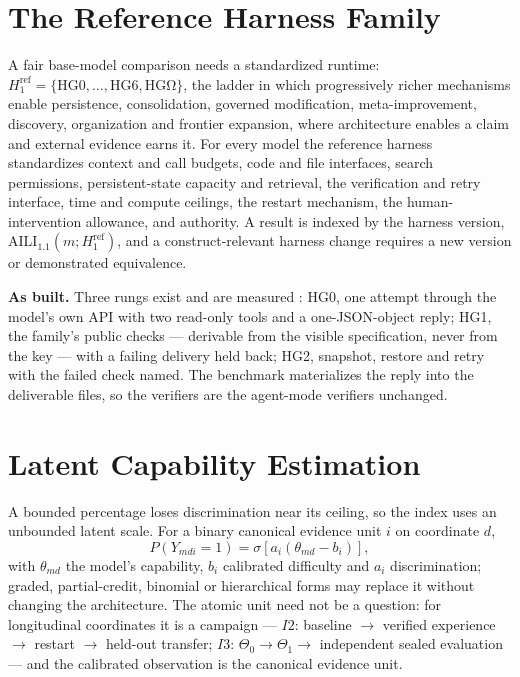 \documentclass[11pt]{article}
\theoremstyle{definition}
\begin{document}
\section{The Reference Harness Family}\label{sec:harness}

A fair base-model comparison needs a standardized runtime: $H^{\mathrm{ref}}_1 = \{\mathrm{HG0}, \ldots, \mathrm{HG6}, \mathrm{HG\Omega}\}$, the ladder in which progressively richer mechanisms enable persistence, consolidation, governed modification, meta-improvement, discovery, organization and frontier expansion, where architecture enables a claim and external evidence earns it. For every model the reference harness standardizes context and call budgets, code and file interfaces, search permissions, persistent-state capacity and retrieval, the verification and retry interface, time and compute ceilings, the restart mechanism, the human-intervention allowance, and authority. A result is indexed by the harness version, $\mathrm{AILI}_{1.1}(m; H^{\mathrm{ref}}_1)$, and a construct-relevant harness change requires a new version or demonstrated equivalence.

\textbf{As built.} Three rungs exist and are measured \citep{yang2026hilbench}: HG0, one attempt through the model's own API with two read-only tools and a one-JSON-object reply; HG1, the family's public checks --- derivable from the visible specification, never from the key --- with a failing delivery held back; HG2, snapshot, restore and retry with the failed check named. The benchmark materializes the reply into the deliverable files, so the verifiers are the agent-mode verifiers unchanged.

\section{Latent Capability Estimation}\label{sec:latent}

A bounded percentage loses discrimination near its ceiling, so the index uses an unbounded latent scale. For a binary canonical evidence unit $i$ on coordinate $d$,
\[
P(Y_{mdi} = 1) = \sigma\!\left[a_i(\theta_{md} - b_i)\right],
\]
with $\theta_{md}$ the model's capability, $b_i$ calibrated difficulty and $a_i$ discrimination; graded, partial-credit, binomial or hierarchical forms may replace it without changing the architecture. The atomic unit need not be a question: for longitudinal coordinates it is a campaign --- $I2$: baseline $\to$ verified experience $\to$ restart $\to$ held-out transfer; $I3$: $\Theta_0 \to \Theta_1 \to$ independent sealed evaluation --- and the calibrated observation is the canonical evidence unit.
\end{document}
